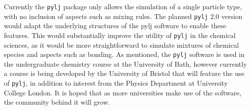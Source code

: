 Currently the \texttt{pylj} package only allows the simulation of a single particle type, with no inclusion of aspects such as mixing rules.
The planned \texttt{pylj} 2.0 version would adapt the underlying structures of the pylj software to enable these features.
This would substantially improve the utility of \texttt{pylj} in the chemical sciences, as it would be more straightforward to simulate mixtures of chemical species and aspects such as bonding.
As mentioned, the \texttt{pylj} software is used in the undergraduate chemistry course at the University of Bath, however currently a course is being developed by the University of Bristol that will feature the use of \texttt{pylj}, in addition to interest from the Physics Department at University College London.
It is hoped that as more universities make use of the software, the community behind it will grow. 


\renewcommand\bibsection{\section{\refname}}


